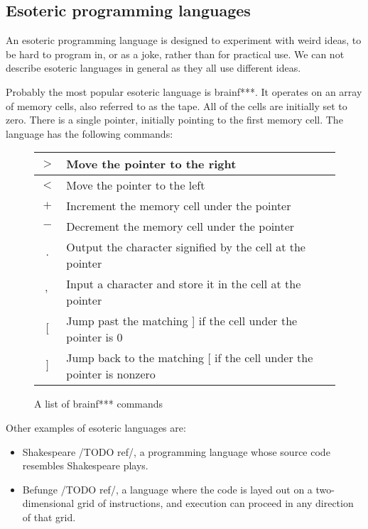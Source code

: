 \subsection{Esoteric programming languages}
An esoteric programming language is designed to experiment with weird ideas, to be hard to program in, or as a joke, rather than for practical use. We can not
describe esoteric languages in general as they all use different ideas.

Probably the most popular esoteric language is brainf***. It operates on an array of memory cells, also referred to as the tape. All of the cells are initially
set to zero. There is a single pointer, initially pointing to the first memory cell. The language has the following commands:

\begin{figure}[!hbt]
    \centering
    \begin{tabular}{|c l |} 
    \hline
    $>$ & Move the pointer to the right \\
    \hline
    $<$ & Move the pointer to the left \\
    \hline
    $+$ & Increment the memory cell under the pointer \\
    \hline
    $-$ & Decrement the memory cell under the pointer \\
    \hline
    $.$ & Output the character signified by the cell at the pointer \\
    \hline
    $,$ & Input a character and store it in the cell at the pointer \\
    \hline
    $[$ & Jump past the matching ] if the cell under the pointer is 0 \\
    \hline
    $]$ & Jump back to the matching [ if the cell under the pointer is nonzero \\
    \hline
    \end{tabular}
    \caption{A list of brainf*** commands}
\end{figure}

Other examples of esoteric languages are:
\begin{itemize}
    \item Shakespeare /TODO ref/, a programming language whose source code resembles Shakespeare plays. 
    \item Befunge /TODO ref/, a language where the code is layed out on a two-dimensional grid of instructions, and execution can proceed in any direction of that grid.
\end{itemize}

